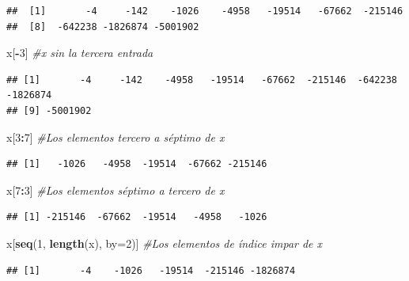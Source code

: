 \documentclass[]{book}
\newenvironment{Shaded}{\begin{snugshade}}{\end{snugshade}}
\newcommand{\CommentTok}[1]{\textcolor[rgb]{0.56,0.35,0.01}{\textit{#1}}}
\newcommand{\DataTypeTok}[1]{\textcolor[rgb]{0.13,0.29,0.53}{#1}}
\newcommand{\DecValTok}[1]{\textcolor[rgb]{0.00,0.00,0.81}{#1}}
\newcommand{\KeywordTok}[1]{\textcolor[rgb]{0.13,0.29,0.53}{\textbf{#1}}}
\newcommand{\NormalTok}[1]{#1}
\newcommand{\OperatorTok}[1]{\textcolor[rgb]{0.81,0.36,0.00}{\textbf{#1}}}
\theoremstyle{definition}
\theoremstyle{definition}
\theoremstyle{definition}
\theoremstyle{remark}
\begin{document}
\begin{verbatim}
##  [1]       -4     -142    -1026    -4958   -19514   -67662  -215146
##  [8]  -642238 -1826874 -5001902
\end{verbatim}

\begin{Shaded}
\begin{Highlighting}[]
\NormalTok{x[}\OperatorTok{-}\DecValTok{3}\NormalTok{] }\CommentTok{#x sin la tercera entrada}
\end{Highlighting}
\end{Shaded}

\begin{verbatim}
## [1]       -4     -142    -4958   -19514   -67662  -215146  -642238 -1826874
## [9] -5001902
\end{verbatim}

\begin{Shaded}
\begin{Highlighting}[]
\NormalTok{x[}\DecValTok{3}\OperatorTok{:}\DecValTok{7}\NormalTok{] }\CommentTok{#Los elementos tercero a séptimo de x}
\end{Highlighting}
\end{Shaded}

\begin{verbatim}
## [1]   -1026   -4958  -19514  -67662 -215146
\end{verbatim}

\begin{Shaded}
\begin{Highlighting}[]
\NormalTok{x[}\DecValTok{7}\OperatorTok{:}\DecValTok{3}\NormalTok{] }\CommentTok{#Los elementos séptimo a tercero de x}
\end{Highlighting}
\end{Shaded}

\begin{verbatim}
## [1] -215146  -67662  -19514   -4958   -1026
\end{verbatim}

\begin{Shaded}
\begin{Highlighting}[]
\NormalTok{x[}\KeywordTok{seq}\NormalTok{(}\DecValTok{1}\NormalTok{, }\KeywordTok{length}\NormalTok{(x), }\DataTypeTok{by=}\DecValTok{2}\NormalTok{)] }\CommentTok{#Los elementos de índice impar de x}
\end{Highlighting}
\end{Shaded}

\begin{verbatim}
## [1]       -4    -1026   -19514  -215146 -1826874
\end{verbatim}
\end{document}
